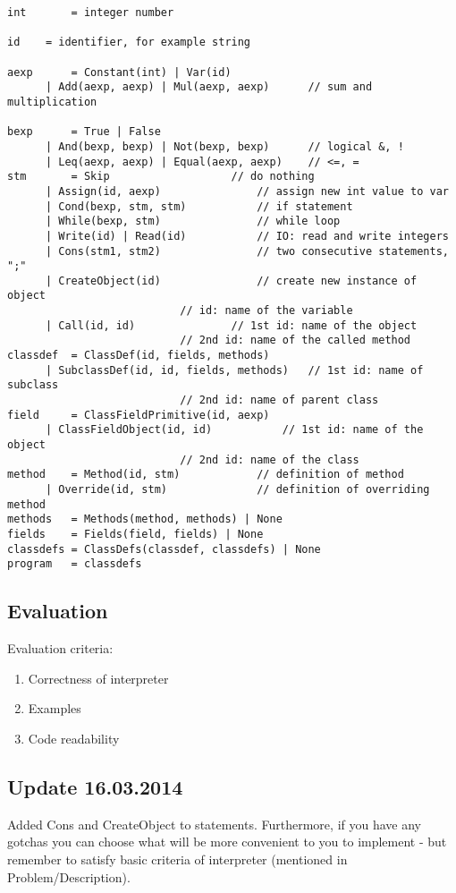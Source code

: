 \documentclass[a4paper,11pt]{article}
\begin{document}
\begin{lstlisting}
int 	  = integer number

id 	  = identifier, for example string

aexp 	  = Constant(int) | Var(id)
	  | Add(aexp, aexp) | Mul(aexp, aexp)	   // sum and multiplication

bexp 	  = True | False
	  | And(bexp, bexp) | Not(bexp, bexp)	   // logical &, !
	  | Leq(aexp, aexp) | Equal(aexp, aexp)	   // <=, =
stm 	  = Skip 				   // do nothing
	  | Assign(id, aexp)			   // assign new int value to var
	  | Cond(bexp, stm, stm)		   // if statement
	  | While(bexp, stm)			   // while loop
	  | Write(id) | Read(id)		   // IO: read and write integers
	  | Cons(stm1, stm2)			   // two consecutive statements, ";"
	  | CreateObject(id)			   // create new instance of object
						   // id: name of the variable
	  | Call(id, id)			   // 1st id: name of the object
						   // 2nd id: name of the called method
classdef  = ClassDef(id, fields, methods)
	  | SubclassDef(id, id, fields, methods)   // 1st id: name of subclass
						   // 2nd id: name of parent class
field  	  = ClassFieldPrimitive(id, aexp)
	  | ClassFieldObject(id, id)		   // 1st id: name of the object
						   // 2nd id: name of the class
method    = Method(id, stm)			   // definition of method
	  | Override(id, stm)			   // definition of overriding method
methods   = Methods(method, methods) | None
fields    = Fields(field, fields) | None
classdefs = ClassDefs(classdef, classdefs) | None
program   = classdefs 
\end{lstlisting}

\subsection{Evaluation}
Evaluation criteria:
\begin{enumerate}
 \item Correctness of interpreter
 \item Examples
 \item Code readability
\end{enumerate}

\subsection{Update 16.03.2014}
Added Cons and CreateObject to statements. Furthermore, if you have any gotchas
you can choose what will be more convenient to you to implement - but remember to satisfy basic criteria of 
interpreter (mentioned in Problem/Description).
\end{document}
